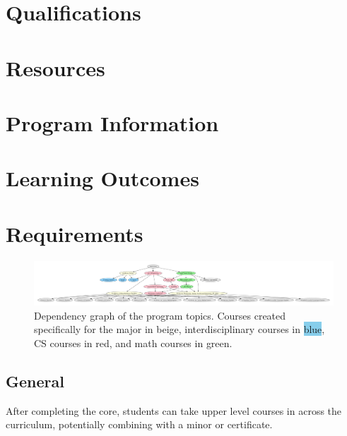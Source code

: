 \documentclass[
10pt, %
a4paper, %
oneside, %
headinclude,footinclude, %
BCOR5mm, %
]{scrartcl}
\begin{document}
\section{Qualifications}



\section{Resources}



\section{Program Information}



\section{Learning Outcomes}



\section{Requirements}

\begin{figure}

  \includegraphics[width=1.2\linewidth]{dependency_graph/all}
  \caption{Dependency graph of the program topics.  Courses created specifically for the \ai{} major in \colorbox{yellow!30}{beige}, interdisciplinary courses in \colorbox{SkyBlue}{blue}, CS courses in \colorbox{red!30}{red}, and math courses in \colorbox{green!30}{green}.}
\end{figure}


  

\subsection{General}

After completing the core, students can take upper level courses in \ai{} across the curriculum, potentially combining with a minor or certificate.
\end{document}
